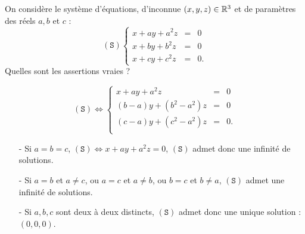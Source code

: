 \begin{question}
On considère le système d'équations, d'inconnue $(x,y,z)\in \mathbb{R}^3$ et de paramètres des réels  $a,b$ et $c$ : 
$$(\mathtt{S})  
\left\{\begin{array}{rcc}
x+ay+a^2z&=&0\\
x+by+b^2z&=&0\\ 
x+cy+c^2z&=&0.\end{array}\right.$$
Quelles sont les assertions vraies ?
\begin{answers}  
\end{answers}
\begin{explanations} 
$$(\mathtt{S}) \Leftrightarrow  
\left\{\begin{array}{rcc}
x+ay+a^2z&=&0\\
(b-a)y+(b^2-a^2)z&=&0\\ 
(c-a)y+(c^2-a^2)z&=&0.\\ 
\end{array}\right.$$
\begin{enumerate}
\item[-]Si $a=b=c$, $(\mathtt{S})\Leftrightarrow  x+ay+a^2z=0 $, $(\mathtt{S})$ admet donc une infinité de solutions.
\item[-]Si $a=b$ et $a\neq c$, ou $a=c$ et $a\neq b$, ou  $b=c$ et $b\neq a$, $(\mathtt{S})$ admet  une infinité de solutions.
\item[-]Si $a,b,c$ sont deux à deux distincts, $(\mathtt{S})$ admet donc une unique solution : $(0,0,0)$.
\end{enumerate}
\end{explanations}
\end{question}

